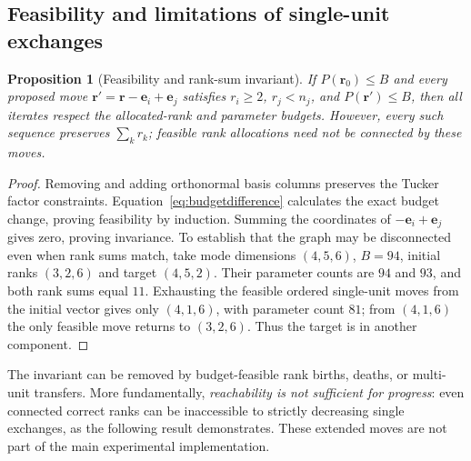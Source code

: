 \documentclass[review,10pt]{elsarticle}
\newtheorem{proposition}{Proposition}
\begin{document}
\subsection{Feasibility and limitations of single-unit exchanges}\label{subsec:feasibility}
\begin{proposition}[Feasibility and rank-sum invariant]\label{prop:budget}
If $P(\boldsymbol r_0)\leq B$ and every proposed move $\boldsymbol r'=\boldsymbol r-\boldsymbol e_i+\boldsymbol e_j$ satisfies $r_i\ge2$, $r_j<n_j$, and $P(\boldsymbol r')\le B$, then all iterates respect the allocated-rank and parameter budgets. However, every such sequence preserves $\sum_k r_k$; feasible rank allocations need not be connected by these moves.
\end{proposition}
\begin{proof}
Removing and adding orthonormal basis columns preserves the Tucker factor constraints. Equation~\eqref{eq:budgetdifference} calculates the exact budget change, proving feasibility by induction. Summing the coordinates of $-\boldsymbol e_i+\boldsymbol e_j$ gives zero, proving invariance. To establish that the graph may be disconnected even when rank sums match, take mode dimensions $(4,5,6)$, $B=94$, initial ranks $(3,2,6)$ and target $(4,5,2)$. Their parameter counts are $94$ and $93$, and both rank sums equal $11$. Exhausting the feasible ordered single-unit moves from the initial vector gives only $(4,1,6)$, with parameter count $81$; from $(4,1,6)$ the only feasible move returns to $(3,2,6)$. Thus the target is in another component.\end{proof}

The invariant can be removed by budget-feasible rank births, deaths, or multi-unit transfers. More fundamentally, \emph{reachability is not sufficient for progress}: even connected correct ranks can be inaccessible to strictly decreasing single exchanges, as the following result demonstrates. These extended moves are not part of the main experimental implementation.
\end{document}
